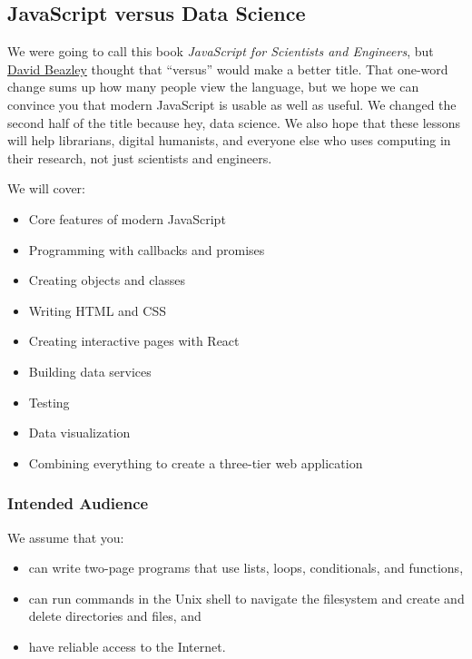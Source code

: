 
\subsection{JavaScript versus Data Science}\label{s:en}

We were going to call this book \emph{JavaScript for Scientists and
Engineers}, but \href{https://www.dabeaz.com/}{David Beazley} thought
that ``versus'' would make a better title. That one-word change sums up
how many people view the language, but we hope we can convince you that
modern JavaScript is usable as well as useful. We changed the second
half of the title because hey, data science. We also hope that these
lessons will help librarians, digital humanists, and everyone else who
uses computing in their research, not just scientists and engineers.

We will cover:

\begin{itemize}
\tightlist
\item
  Core features of modern JavaScript
\item
  Programming with callbacks and promises
\item
  Creating objects and classes
\item
  Writing HTML and CSS
\item
  Creating interactive pages with React
\item
  Building data services
\item
  Testing
\item
  Data visualization
\item
  Combining everything to create a three-tier web application
\end{itemize}

\subsubsection{Intended Audience}\label{s:intro-audience}

We assume that you:

\begin{itemize}
\tightlist
\item
  can write two-page programs that use lists, loops, conditionals, and
  functions,
\item
  can run commands in the Unix shell to navigate the filesystem and
  create and delete directories and files, and
\item
  have reliable access to the Internet.
\end{itemize}

